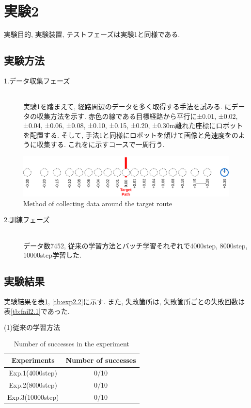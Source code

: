 \newpage
\section{実験2}
実験目的, 実験装置, テストフェーズは実験1と同様である.
\subsection{実験方法}
\begin{description}
  \item[1.データ収集フェーズ]\mbox{}\\実験1を踏まえて, 経路周辺のデータを多く取得する手法を試みる. にデータの収集方法を示す. 赤色の線である目標経路から平行に±0.01, ±0.02, ±0.04, ±0.06, ±0.08, ±0.10, ±0.15, ±0.20, ±0.30m離れた座標にロボットを配置する. そして, 手法1と同様にロボットを傾けて画像と角速度をのように収集する. これをに示すコースで一周行う.  
\end{description}

\begin{figure}[h]
  \centering
  \includegraphics[keepaspectratio, scale=0.18]{images/collect-data.png}
  \caption{Method of collecting data around the target route}
  \label{Fig:collect-data}
  \end{figure}

\begin{description}
  \item[2.訓練フェーズ]\mbox{}\\データ数7452, 従来の学習方法とバッチ学習それぞれで4000step, 8000step, 10000step学習した. 
\end{description}

\subsection{実験結果}
実験結果を表\ref{tb:exp2.1}, \ref{tb:exp2.2}に示す. また, 失敗箇所は, 失敗箇所ごとの失敗回数は表\ref{tb:fail2.1}であった. 

\newpage
\begin{description}
  \item [(1)従来の学習方法]
\end{description}
\begin{table}[h]
  \centering
  \begin{tabular}{|c|c|} \hline
    Experiments & Number of successes \\ \hline
    Exp.1(4000step) & 0/10 \\ \hline
    Exp.2(8000step) & 0/10 \\ \hline
    Exp.3(10000step) & 0/10 \\ \hline
  \end{tabular}
  \caption{Number of successes in the experiment}
  \label{tb:exp2.1}
\end{table}

